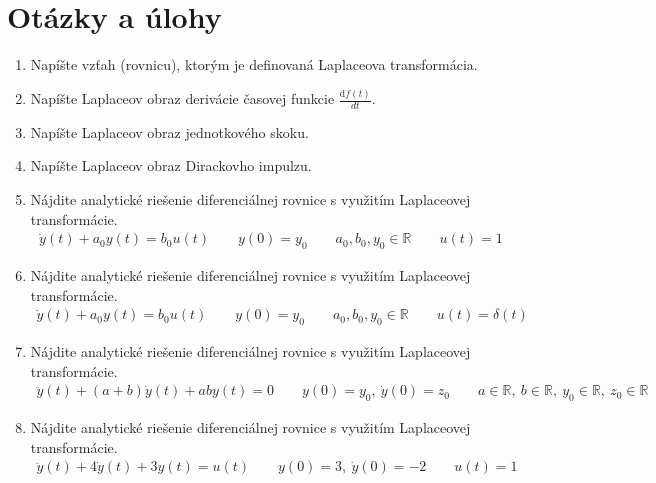\documentclass[a4paper, 10pt, ]{article}
\begin{document}


\section{Otázky a úlohy}

\begin{enumerate}[leftmargin=0pt, labelsep=3mm, itemsep=0pt]

    \item Napíšte vzťah (rovnicu), ktorým je definovaná Laplaceova transformácia.

    \item Napíšte Laplaceov obraz derivácie časovej funkcie $\frac{\text{d}f(t)}{dt}$.

    \item Napíšte Laplaceov obraz jednotkového skoku.

    \item Napíšte Laplaceov obraz Dirackovho impulzu.

    \item Nájdite analytické riešenie diferenciálnej rovnice s využitím Laplaceovej transformácie.
    \begin{align*}
        \dot y(t) + a_0 y(t) = b_0 u(t) \qquad y(0) = y_0 \qquad a_0, b_0, y_0\in\mathbb R \qquad u(t) = 1
    \end{align*}

    \item Nájdite analytické riešenie diferenciálnej rovnice s využitím Laplaceovej transformácie.
    \begin{align*}
        \dot y(t) + a_0 y(t) = b_0 u(t) \qquad y(0) = y_0 \qquad a_0, b_0, y_0\in\mathbb R \qquad u(t) = \delta(t)
    \end{align*}

    \item Nájdite analytické riešenie diferenciálnej rovnice s využitím Laplaceovej transformácie.
    \begin{align*}
        \ddot y(t) + (a+b) \dot y(t) + ab y(t) = 0 \qquad y(0) = y_0,\ \dot y(0) = z_0  \qquad a\in\mathbb R,\ b\in\mathbb R,\ y_0\in\mathbb R,\ z_0\in\mathbb R
    \end{align*}

    \item Nájdite analytické riešenie diferenciálnej rovnice s využitím Laplaceovej transformácie.
    \begin{align*}
        \ddot y(t) +4 \dot y(t) + 3y(t) = u(t) \qquad y(0) = 3,\ \dot y(0) = -2 \qquad u(t) = 1
    \end{align*}


\end{enumerate}
\end{document}
